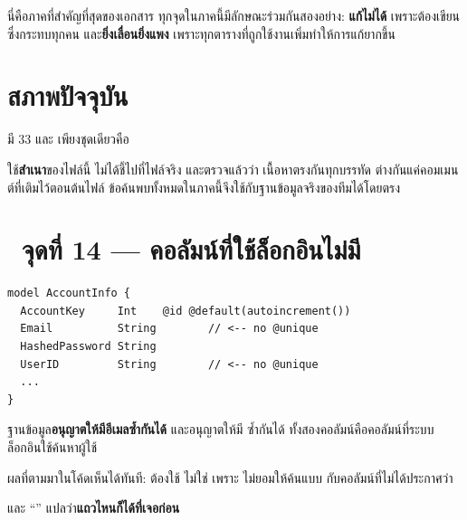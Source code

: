 นี่คือภาคที่สำคัญที่สุดของเอกสาร ทุกจุดในภาคนี้มีลักษณะร่วมกันสองอย่าง:
\textbf{ แก้ไม่ได้} เพราะต้องเขียน  ซึ่งกระทบทุกคน
และ\textbf{ยิ่งเลื่อนยิ่งแพง} เพราะทุกตารางที่ถูกใช้งานเพิ่มทำให้การแก้ยากขึ้น

\section{สภาพปัจจุบัน}

 มี 33  และ 
เพียงชุดเดียวคือ 

 ใช้\textbf{สำเนา}ของไฟล์นี้ ไม่ได้ชี้ไปที่ไฟล์จริง และตรวจแล้วว่า
เนื้อหาตรงกันทุกบรรทัด ต่างกันแค่คอมเมนต์ที่เติมไว้ตอนต้นไฟล์
ข้อค้นพบทั้งหมดในภาคนี้จึงใช้กับฐานข้อมูลจริงของทีมได้โดยตรง

\section{\pzero\ จุดที่ 14 --- คอลัมน์ที่ใช้ล็อกอินไม่มี }

\begin{badbox}[title={ช่องโหว่ที่ร้ายแรงที่สุดในเอกสารนี้ · \code{schema.prisma:22, 24}}]
\begin{lstlisting}[language={}]
model AccountInfo {
  AccountKey     Int    @id @default(autoincrement())
  Email          String        // <-- no @unique
  HashedPassword String
  UserID         String        // <-- no @unique
  ...
}
\end{lstlisting}
\vspace{-0.4em}
ฐานข้อมูล\textbf{อนุญาตให้มีอีเมลซ้ำกันได้} และอนุญาตให้มี 
ซ้ำกันได้ ทั้งสองคอลัมน์คือคอลัมน์ที่ระบบล็อกอินใช้ค้นหาผู้ใช้
\end{badbox}

ผลที่ตามมาในโค้ดเห็นได้ทันที:  ต้องใช้ 
ไม่ใช่  เพราะ  ไม่ยอมให้ค้นแบบ 
กับคอลัมน์ที่ไม่ได้ประกาศว่า 

และ ``'' แปลว่า\textbf{แถวไหนก็ได้ที่เจอก่อน}

